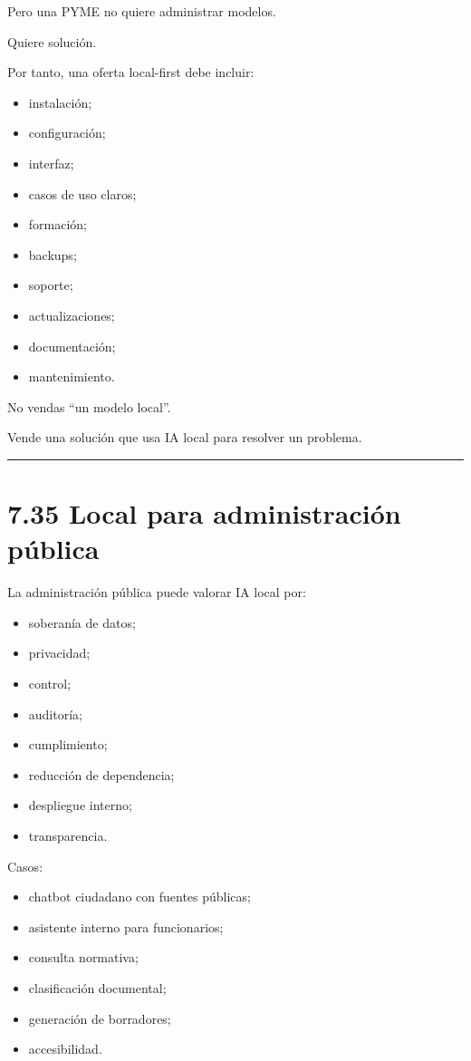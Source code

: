 Pero una PYME no quiere administrar modelos.

Quiere solución.

Por tanto, una oferta local-first debe incluir:

\begin{itemize}
\tightlist
\item
  instalación;
\item
  configuración;
\item
  interfaz;
\item
  casos de uso claros;
\item
  formación;
\item
  backups;
\item
  soporte;
\item
  actualizaciones;
\item
  documentación;
\item
  mantenimiento.
\end{itemize}

No vendas ``un modelo local''.

Vende una solución que usa IA local para resolver un problema.

\begin{center}\rule{0.5\linewidth}{0.5pt}\end{center}

\section{7.35 Local para administración
pública}\label{local-para-administraciuxf3n-puxfablica}

La administración pública puede valorar IA local por:

\begin{itemize}
\tightlist
\item
  soberanía de datos;
\item
  privacidad;
\item
  control;
\item
  auditoría;
\item
  cumplimiento;
\item
  reducción de dependencia;
\item
  despliegue interno;
\item
  transparencia.
\end{itemize}

Casos:

\begin{itemize}
\tightlist
\item
  chatbot ciudadano con fuentes públicas;
\item
  asistente interno para funcionarios;
\item
  consulta normativa;
\item
  clasificación documental;
\item
  generación de borradores;
\item
  accesibilidad.
\end{itemize}

